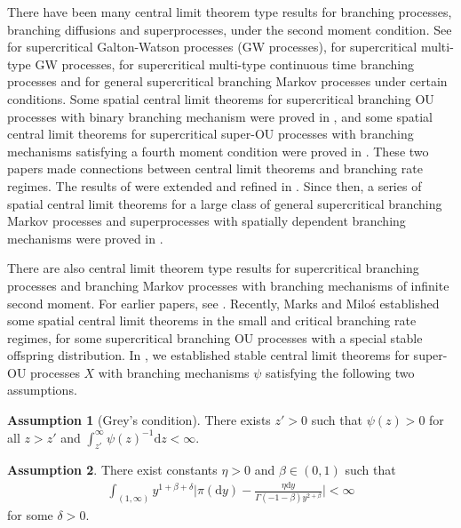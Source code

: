 \documentclass[12pt,a4paper]{amsart}
\theoremstyle{plain}
\theoremstyle{definition}
\newtheorem{asp}{Assumption}
\numberwithin{equation}{section}
\begin{document}
	There have been many central limit theorem type results for branching processes, branching diffusions and superprocesses, under the second moment condition.
	See \cite{Heyde1970A-rate, HeydeBrown1871An-invariance, HeydeLeslie1971Improved} for supercritical Galton-Watson processes (GW processes), \cite{KestenStigum1966Additional,KestenStigum1966A-limit} for supercritical multi-type GW processes, \cite{Athreya1969Limit,Athreya1969LimitB,Athreya1971Some} for supercritical multi-type continuous time branching processes and \cite{AsmussenHering1983Branching} for general supercritical branching Markov processes under certain conditions.
	Some spatial central limit theorems for supercritical branching OU processes with binary branching mechanism were proved
	in \cite{AdamczakMilos2015CLT}, and some
	spatial central limit theorems for supercritical super-OU processes with branching mechanisms satisfying a fourth moment condition were proved in \cite{Milos2012Spatial}.
	These two papers made connections between central limit theorems and branching rate regimes.
	The results of \cite{Milos2012Spatial} were extended and refined in \cite{RenSongZhang2014Central}.
		Since then, a series of spatial central limit theorems for a large class of general supercritical branching Markov processes and superprocesses with spatially dependent branching mechanisms were proved in \cite{RenSongZhang2014CentralB,RenSongZhang2015Central,RenSongZhang2017Central}.

There are also  central  limit theorem type results for supercritical branching processes and branching Markov processes with branching mechanisms of infinite second moment. 
For earlier papers, see \cite{Asmussen76Convergence, Heyde1971Some}. 	
Recently, Marks and Milo\'s \cite{MarksMilos2018CLT} established some spatial central limit theorems in the small and critical branching rate regimes, for
some supercritical branching OU processes with a special stable offspring distribution.
In \cite{RenSongSunZhao2019Stable}, we
established stable central limit theorems for
super-OU processes $X$ with branching mechanisms $\psi$ satisfying the following two assumptions.


\begin{asp}[Grey's condition]
	\label{asp: Greys condition}
	There exists $z' > 0$ such that $\psi(z) > 0$ for all $z>z'$ and  $\int_{z'}^\infty \psi(z)^{-1} \mathrm dz < \infty$.
\end{asp}

\begin{asp}
	\label{asp: branching mechanism}
  There exist constants $\eta > 0$ and $\beta \in (0,1)$ such that
  \begin{align}
    \int_{(1,\infty)}y^{1+\beta +\delta}\Big|\pi(\mathrm dy)-\frac{\eta \mathrm dy}{\Gamma(-1-\beta)y^{2+\beta}}\Big| <\infty
  \end{align}
for some $\delta > 0$.
\end{asp}
\end{document}
